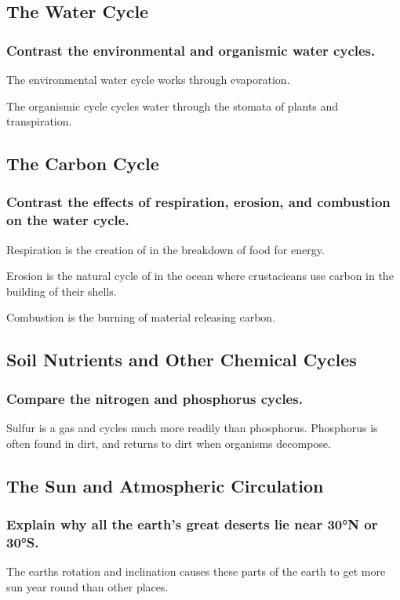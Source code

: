 \documentclass[a4paper]{article}
\begin{document}
\subsection{The Water Cycle}
\subsubsection{Contrast the environmental and organismic water cycles.}
The environmental water cycle works through evaporation.

The organismic cycle cycles water through the stomata of plants and transpiration.

\subsection{The Carbon Cycle}
\subsubsection{Contrast the effects of respiration, erosion, and combustion on the water cycle.}
Respiration is the creation of  in the breakdown of food for energy.

Erosion is the natural cycle of  in the ocean where crustacieans use carbon in the building 
of their shells.

Combustion is the burning of material releasing carbon.

\subsection{Soil Nutrients and Other Chemical Cycles}
\subsubsection{Compare the nitrogen and phosphorus cycles.}
Sulfur is a gas and cycles much more readily than phosphorus. Phosphorus is often found in dirt, and returns to dirt when organisms
decompose.

\subsection{The Sun and Atmospheric Circulation}
\subsubsection{Explain why all the earth's great deserts lie near 30°N or 30°S.}
The earths rotation and inclination causes these parts of the earth to get more sun year round than other places.
\end{document}
